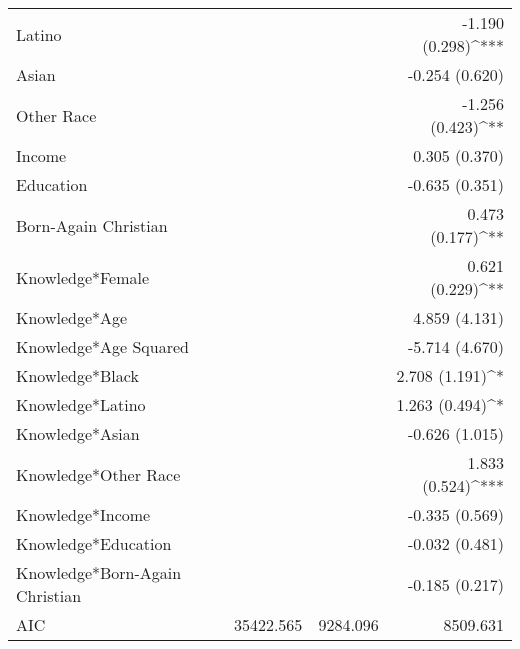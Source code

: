 \begin{tabular}{l D{)}{)}{13)3} D{)}{)}{13)3} D{)}{)}{13)3} }
Latino                             &                         &                         & -1.190 \; (0.298)^{***} \\
Asian                              &                         &                         & -0.254 \; (0.620)       \\
Other Race                         &                         &                         & -1.256 \; (0.423)^{**}  \\
Income                             &                         &                         & 0.305 \; (0.370)        \\
Education                          &                         &                         & -0.635 \; (0.351)       \\
Born-Again Christian               &                         &                         & 0.473 \; (0.177)^{**}   \\
Knowledge*Female                   &                         &                         & 0.621 \; (0.229)^{**}   \\
Knowledge*Age                      &                         &                         & 4.859 \; (4.131)        \\
Knowledge*Age Squared              &                         &                         & -5.714 \; (4.670)       \\
Knowledge*Black                    &                         &                         & 2.708 \; (1.191)^{*}    \\
Knowledge*Latino                   &                         &                         & 1.263 \; (0.494)^{*}    \\
Knowledge*Asian                    &                         &                         & -0.626 \; (1.015)       \\
Knowledge*Other Race               &                         &                         & 1.833 \; (0.524)^{***}  \\
Knowledge*Income                   &                         &                         & -0.335 \; (0.569)       \\
Knowledge*Education                &                         &                         & -0.032 \; (0.481)       \\
Knowledge*Born-Again Christian     &                         &                         & -0.185 \; (0.217)       \\
\midrule
AIC                                & 35422.565               & 9284.096                & 8509.631                \\

\end{tabular}
